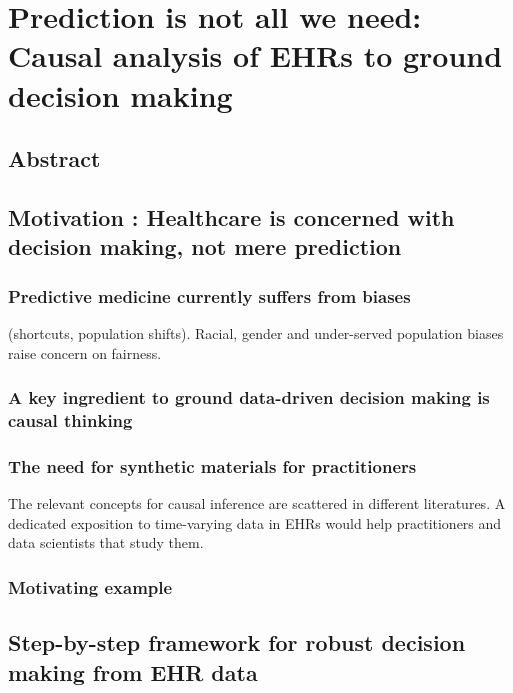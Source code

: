 \documentclass{report}
\begin{document}
\chapter{Prediction is not all we need: Causal analysis of EHRs to ground decision making}\label{chapter:causal_tuto}
\section{Abstract}\label{sec:causal_tuto:abstract}

\section{Motivation : Healthcare is concerned with decision making, not mere prediction}\label{sec:causal_tuto:motivation}

\subsection{Predictive medicine currently suffers from biases}\label{subsec:causal_tuto:predictive_medicine_biases}
(shortcuts, population shifts). Racial, gender and under-served population biases raise concern on fairness.
\subsection{A key ingredient to ground data-driven decision making is causal thinking}

\subsection{The need for synthetic materials for practitioners}\label{subsec:causal_tuto:synthetic_materials}

The relevant concepts for causal inference are scattered in different literatures. A dedicated exposition to time-varying data in EHRs would help practitioners and data scientists that study them.
\subsection{Motivating example}\label{subsec:causal_tuto:motivating_example}


\section{Step-by-step framework for robust decision making from EHR data}\label{sec:causal_tuto:framework}
\end{document}
